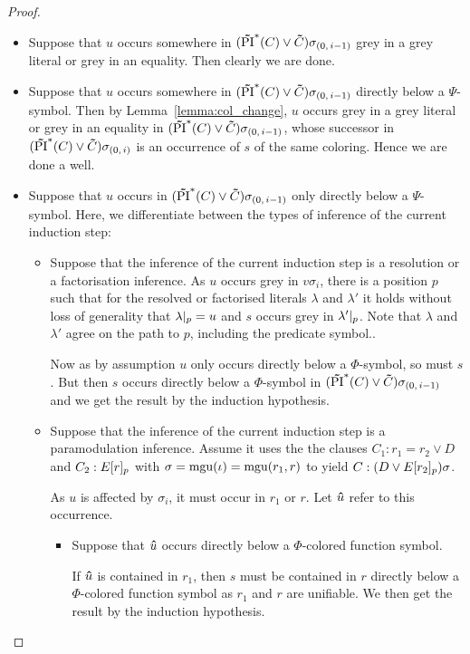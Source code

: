 \documentclass[%
	draft=false,%
	numbers=noendperiod,%
	11pt,%
	a4paper,%
	oneside,%
	openany,%
]{memoir}
\begin{document}
\begin{proof}
\begin{itemize}
			\begin{itemize}
				\item Suppose that $u$ occurs somewhere in $(\bm\tilde{\operatorname{PI}}^{*}(C)\lor \bm\tilde{C})\sigma_{(0,\,i-1)}$ grey in a grey literal or grey in an equality. Then clearly we are done.
				\item Suppose that $u$ occurs somewhere in $(\bm\tilde{\operatorname{PI}}^{*}(C)\lor \bm\tilde{C})\sigma_{(0,\,i-1)}$ directly below a $\Psi$-symbol.
					Then by Lemma~\ref{lemma:col_change}, $u$ occurs grey in a grey literal or grey in an equality in $(\bm\tilde{\operatorname{PI}}^{*}(C)\lor \bm\tilde{C})\sigma_{(0,\,i-1)}$, whose successor in $(\bm\tilde{\operatorname{PI}}^{*}(C)\lor \bm\tilde{C})\sigma_{(0,\,i)}$ is an occurrence of $s$ of the same coloring. Hence we are done a well.
				\item Suppose that $u$ occurs in $(\bm\tilde{\operatorname{PI}}^{*}(C)\lor \bm\tilde{C})\sigma_{(0,\,i-1)}$ only directly below a $\Psi$-symbol.
					Here, we differentiate between the types of inference of the current induction step:

					\begin{itemize}
						\item
							Suppose that the inference of the current induction step is a resolution or a factorisation inference.
							As $u$ occurs grey in $v\sigma_i$, there is a position $p$ such that for the resolved or factorised literals $\lambda$ and $\lambda'$ it holds without loss of generality that $\lambda|_{p} = u$ and $s$ occurs grey in $\lambda'|_{p}$.
							Note that $\lambda$ and $\lambda'$ agree on the path to $p$, including the predicate symbol..

							Now as by assumption $u$ only occurs directly below a $\Phi$-symbol, so must $s$.
							But then $s$ occurs directly below a $\Phi$-symbol in $(\bm\tilde{\operatorname{PI}}^{*}(C)\lor \bm\tilde{C})\sigma_{(0,\,i-1)}$ and we get the result by the induction hypothesis.

						\item
							Suppose that the inference of the current induction step is a paramodulation inference.
							Assume it uses the the clauses $C_1: r_1=r_2 \lor D$ and $C_2: E{[r]_{p}}$ with $\sigma=\operatorname{mgu}(\iota)=\operatorname{mgu}(r_1, r)$ to yield $C: (D\lor E{[r_2]_{p}})\sigma$.

							As $u$ is affected by $\sigma_i$, it must occur in $r_1$ or $r$. Let $\bm\hat u$ refer to this occurrence.

							\begin{itemize}
								\item
									Suppose that $\bm\hat u$ occurs directly below a $\Phi$-colored function symbol. 

									If $\bm\hat u$ is contained in $r_1$, then $s$ must be contained in $r$ directly below a $\Phi$-colored function symbol as $r_1$ and $r$ are unifiable. We then get the result by the induction hypothesis.


\end{itemize}
\end{itemize}
\end{itemize}
\end{itemize}
\end{proof}
\end{document}

